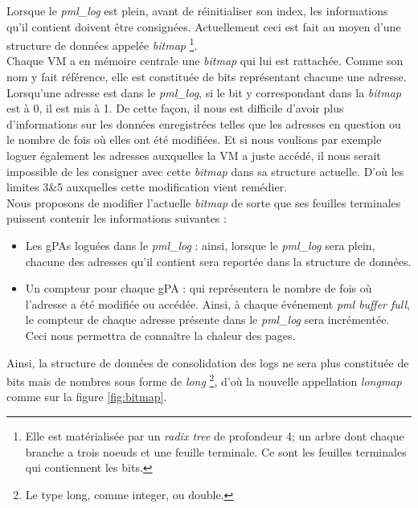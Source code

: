 \noindent Lorsque le \textit{pml\_log} est plein, avant de réinitialiser son index, les informations qu'il contient doivent être consignées. Actuellement ceci est fait au moyen d'une structure de données appelée \textit{bitmap}  \footnote{Elle est matérialisée par un \textit{radix tree} de profondeur 4; un arbre dont chaque branche a trois noeuds et une feuille terminale. Ce sont les feuilles terminales qui contiennent les bits.}.\\
Chaque VM a en mémoire centrale une \textit{bitmap} qui lui est rattachée. Comme son nom y fait référence, elle est constituée de bits représentant chacune une adresse. Lorsqu'une adresse est dans le \textit{pml\_log}, si le bit y correspondant dans la \textit{bitmap} est à 0, il est mis à 1. De cette façon, il nous est difficile d'avoir plus d'informations sur les données enregistrées telles que les adresses en question ou le nombre de fois où elles ont été modifiées. Et si nous voulions par exemple loguer également les adresses auxquelles la VM a juste accédé, il nous serait impossible de les consigner avec cette \textit{bitmap} dans sa structure actuelle. D'où les limites 3\&5 auxquelles cette modification vient remédier.\\
Nous proposons de modifier l'actuelle \textit{bitmap} de sorte que ses feuilles terminales puissent contenir les informations suivantes :
\begin{itemize}
    \item Les gPAs loguées dans le \textit{pml\_log} : ainsi, lorsque le \textit{pml\_log} sera plein, chacune des adresses qu'il contient sera reportée dans la structure de données.
    \item Un compteur pour chaque gPA : qui représentera le nombre de fois où l'adresse a été modifiée ou accédée. Ainsi, à chaque événement \textit{pml buffer full}, le compteur de chaque adresse présente dans le \textit{pml\_log} sera incrémentée. Ceci nous permettra de connaître la chaleur des pages.
\end{itemize}

\noindent Ainsi, la structure de données de consolidation des logs ne sera plus constituée de bits mais de nombres sous forme de \textit{long} \footnote{Le type long, comme integer, ou double.}, d'où la nouvelle appellation \textit{longmap} comme sur la figure \ref{fig:bitmap}.

